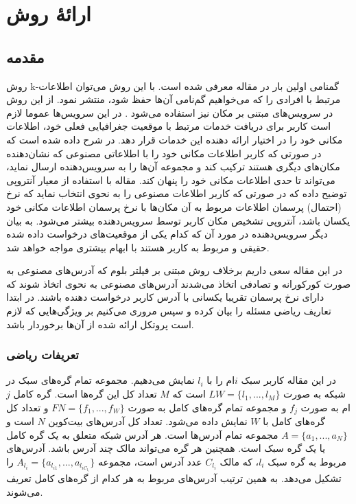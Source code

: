 \chapter{ارائهٔ روش}
\label{proposed}
\section{مقدمه} 
روش k-گمنامی اولین بار در مقاله \cite{Sweeney2002} معرفی شده است. با این روش می‌توان اطلاعات مرتبط با افرادی  را که می‌خواهیم گم‌نامی آن‌ها حفظ شود، منتشر نمود. از این روش در سرویس‌های مبتنی بر مکان نیز استفاده می‌شود \cite{Niu2015} . در این سرویس‌ها عموما لازم است کاربر برای دریافت خدمات مرتبط با موقعیت جغرافیایی فعلی خود، اطلاعات مکانی خود را در اختیار ارائه دهنده این خدمات قرار دهد. در  \cite{Niu2015} شرح داده شده است که در صورتی که کاربر اطلاعات مکانی خود را با اطلاعاتی مصنوعی که نشان‌دهنده مکان‌های دیگری هستند ترکیب کند و مجموعه آن‌ها را به سرویس‌دهنده ارسال نماید، می‌تواند تا حدی اطلاعات مکانی خود را پنهان کند. مقاله \cite{Niu2015} با استفاده از معیار آنتروپی توضیح داده که در صورتی که کاربر اطلاعات مصنوعی را به نحوی انتخاب نماید که نرخ (احتمال) پرسمان اطلاعات مربوط به آن مکان‌ها با نرخ پرسمان اطلاعات مکانی خود یکسان باشد، آنتروپی تشخیص مکان کاربر توسط سرویس‌دهنده بیشتر می‌شود. به بیان دیگر سرویس‌دهنده در مورد آن که کدام یکی از موقعیت‌های درخواست داده شده حقیقی و مربوط به کاربر هستند با ابهام بیشتری مواجه خواهد شد.

در این مقاله سعی داریم برخلاف روش مبتنی بر فیلتر بلوم که آدرس‌های مصنوعی به صورت کورکورانه و تصادفی اتخاذ می‌شدند آدرس‌های مصنوعی به نحوی اتخاذ شوند که دارای نرخ پرسمان تقریبا یکسانی با آدرس کاربر درخواست دهنده باشند. در ابتدا تعاریف ریاضی مسئله را بیان کرده و سپس مروری می‌کنیم بر ویژگی‌هایی که لازم است پروتکل ارائه شده از آن‌ها برخوردار باشد.



\subsection{تعریفات ریاضی}




در این مقاله کاربر سبک $i$ام را با $l_i$ نمایش می‌دهیم. مجموعه تمام گره‌های سبک در شبکه به صورت $LW = \{l_1,..., l_M\}$ است که $M$ تعداد کل این گره‌ها است. گره‌ کامل $j$ام به صورت $f_j$ و مجموعه تمام گره‌های کامل به صورت $FN=\{f_1,..., f_W\}$ و تعداد کل گره‌های کامل با $W$ نمایش داده می‌شود. تعداد کل آدرس‌های بیت‌کوین $N$ است و $A=\{a_1,..., a_N\}$ مجموعه تمام آدرس‌ها است. هر آدرس شبکه متعلق به یک گره کامل یا یک گره سبک است. همچنین هر گره می‌تواند مالک چند آدرس باشد. آدرس‌های مربوط به گره سبک $l_i$، که مالک
$C_{l_i}$ 
عدد آدرس است، مجموعه 
$A_{l_i}=\{a_{l_{i1}},... , a_{l_{iC_{l_i}}}\}$
را تشکیل می‌دهد. به همین ترتیب آدرس‌های مربوط به هر کدام از گره‌های کامل تعریف می‌شوند.

